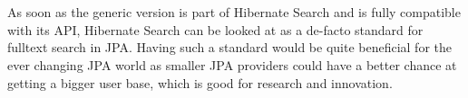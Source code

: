 \\\\
As soon as the generic version is part of Hibernate Search and is fully compatible with its API, Hibernate Search can be looked at as a de-facto standard for fulltext search in JPA. Having such a standard would be quite beneficial for the ever changing JPA world as smaller JPA providers could have a better chance at getting a bigger user base, which is good for research and innovation.

\pagebreak
~